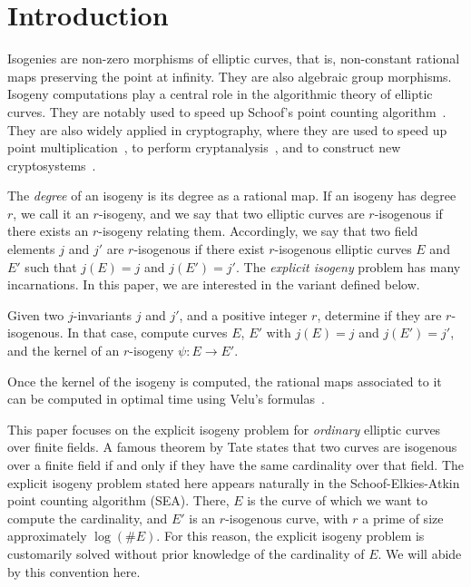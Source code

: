 \documentclass{lms}
\makeatletter
\newenvironment{localblock}[1]{\@exmplstar{\relax}{#1}}{\@endexample}
\makeatother
\begin{document}

\section{Introduction}
\label{sec:introduction}

Isogenies are non-zero morphisms of elliptic curves, that is,
non-constant rational maps preserving the point at infinity. They are
also algebraic group morphisms. Isogeny computations play a central
role in the algorithmic theory of elliptic curves. They are notably
used to speed up Schoof's point counting
algorithm~\cite{schoof85,atkin88,elkies92,schoof95,elkies98}. They are
also widely applied in cryptography, where they are used to speed up
point multiplication~\cite{gallant+lambert+vanstone01,birkner+sica11},
to perform cryptanalysis~\cite{mauer+menezes+teske01}, and to
construct new
cryptosystems~\cite{teske06,charles+lauter+goren09,Stol,defeo+jao+plut12,jao+soukharev2014-signatures}.

The \emph{degree} of an isogeny is its degree as a rational map. If an
isogeny has degree $r$, we call it an $r$-isogeny, and we say that two
elliptic curves are $r$-isogenous if there exists an $r$-isogeny
relating them. Accordingly, we say that two field elements $j$ and
$j'$ are $r$-isogenous if there exist $r$-isogenous elliptic curves
$E$ and $E'$ such that $j(E)=j$ and $j(E')=j'$. The
\emph{explicit isogeny} problem has many incarnations. In this paper,
we are interested in the variant defined below.

\begin{localblock}{Explicit isogeny problem} \label{prob:isogeny-problem}
  Given two $j$-invariants $j$ and $j'$, and a positive integer
  $r$, determine if they are $r$-isogenous. In that case, compute
  curves $E$, $E'$ with $j(E)=j$ and $j(E')=j'$, and the
  kernel of an $r$-isogeny $ψ:E\to E'$.
\end{localblock}

Once the kernel of the isogeny is computed, the rational maps
associated to it can be computed in optimal time using Velu's
formulas~\cite{velu71}.

This paper focuses on the explicit isogeny problem for \emph{ordinary}
elliptic curves over finite fields. A famous theorem by Tate states
that two curves are isogenous over a finite field if and only if they
have the same cardinality over that field. The explicit isogeny
problem stated here appears naturally in the Schoof-Elkies-Atkin point
counting algorithm (SEA). There, $E$ is the curve of which we want to
compute the cardinality, and $E'$ is an $r$-isogenous curve, with $r$
a prime of size approximately $\log(\#E)$. For this reason, the explicit
isogeny problem is customarily solved without prior knowledge of the
cardinality of $E$. We will abide by this convention here.
\end{document}
